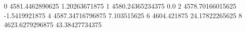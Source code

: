 0 4581.4462890625 1.20263671875
1 4580.24365234375 0.0
2 4578.70166015625 -1.5419921875
4 4587.34716796875 7.103515625
6 4604.421875 24.17822265625
8 4623.6279296875 43.38427734375
